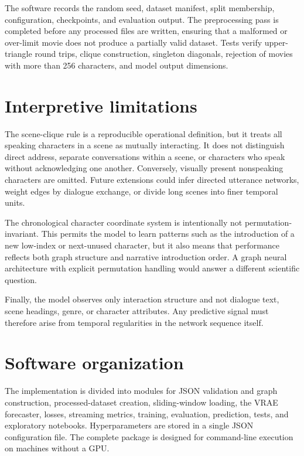 \documentclass[11pt]{article}
\begin{document}
The software records the random seed, dataset manifest, split membership, configuration, checkpoints, and evaluation output. The preprocessing pass is completed before any processed files are written, ensuring that a malformed or over-limit movie does not produce a partially valid dataset. Tests verify upper-triangle round trips, clique construction, singleton diagonals, rejection of movies with more than 256 characters, and model output dimensions.

\section{Interpretive limitations}

The scene-clique rule is a reproducible operational definition, but it treats all speaking characters in a scene as mutually interacting. It does not distinguish direct address, separate conversations within a scene, or characters who speak without acknowledging one another. Conversely, visually present nonspeaking characters are omitted. Future extensions could infer directed utterance networks, weight edges by dialogue exchange, or divide long scenes into finer temporal units.

The chronological character coordinate system is intentionally not permutation-invariant. This permits the model to learn patterns such as the introduction of a new low-index or next-unused character, but it also means that performance reflects both graph structure and narrative introduction order. A graph neural architecture with explicit permutation handling would answer a different scientific question.

Finally, the model observes only interaction structure and not dialogue text, scene headings, genre, or character attributes. Any predictive signal must therefore arise from temporal regularities in the network sequence itself.

\section{Software organization}

The implementation is divided into modules for JSON validation and graph construction, processed-dataset creation, sliding-window loading, the VRAE forecaster, losses, streaming metrics, training, evaluation, prediction, tests, and exploratory notebooks. Hyperparameters are stored in a single JSON configuration file. The complete package is designed for command-line execution on machines without a GPU.
\end{document}
